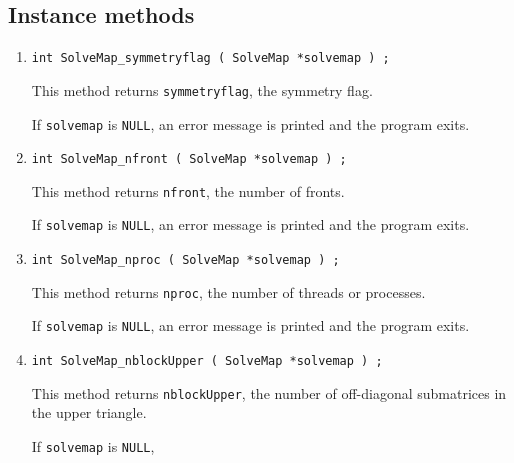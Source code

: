 \subsection{Instance methods}
\label{subsection:SolveMap:proto:instance}
\par
\begin{enumerate}
\item
\begin{verbatim}
int SolveMap_symmetryflag ( SolveMap *solvemap ) ;
\end{verbatim}
This method returns {\tt symmetryflag}, the symmetry flag.
\par {}
If {\tt solvemap} is {\tt NULL},
an error message is printed and the program exits.
\item
\begin{verbatim}
int SolveMap_nfront ( SolveMap *solvemap ) ;
\end{verbatim}
This method returns {\tt nfront}, the number of fronts.
\par {}
If {\tt solvemap} is {\tt NULL},
an error message is printed and the program exits.
\item
\begin{verbatim}
int SolveMap_nproc ( SolveMap *solvemap ) ;
\end{verbatim}
This method returns {\tt nproc}, the number of threads or processes.
\par {}
If {\tt solvemap} is {\tt NULL},
an error message is printed and the program exits.
\item
\begin{verbatim}
int SolveMap_nblockUpper ( SolveMap *solvemap ) ;
\end{verbatim}
This method returns {\tt nblockUpper}, 
the number of off-diagonal submatrices in the upper triangle.
\par {}
If {\tt solvemap} is {\tt NULL},

\end{enumerate}
